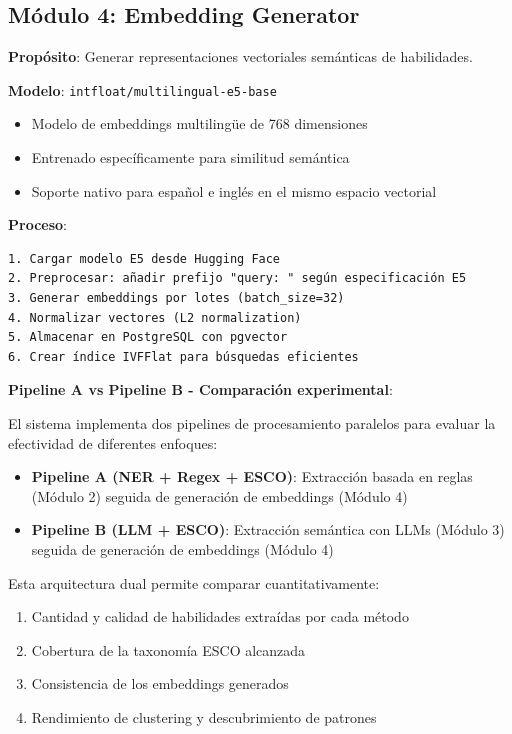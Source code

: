 \subsection{Módulo 4: Embedding Generator}

\textbf{Propósito}: Generar representaciones vectoriales semánticas de habilidades.

\textbf{Modelo}: \texttt{intfloat/multilingual-e5-base}
\begin{itemize}
    \item Modelo de embeddings multilingüe de 768 dimensiones
    \item Entrenado específicamente para similitud semántica
    \item Soporte nativo para español e inglés en el mismo espacio vectorial
\end{itemize}

\textbf{Proceso}:
\begin{verbatim}
1. Cargar modelo E5 desde Hugging Face
2. Preprocesar: añadir prefijo "query: " según especificación E5
3. Generar embeddings por lotes (batch_size=32)
4. Normalizar vectores (L2 normalization)
5. Almacenar en PostgreSQL con pgvector
6. Crear índice IVFFlat para búsquedas eficientes
\end{verbatim}

\textbf{Pipeline A vs Pipeline B - Comparación experimental}:

El sistema implementa dos pipelines de procesamiento paralelos para evaluar la efectividad de diferentes enfoques:

\begin{itemize}
    \item \textbf{Pipeline A (NER + Regex + ESCO)}: Extracción basada en reglas (Módulo 2) seguida de generación de embeddings (Módulo 4)
    \item \textbf{Pipeline B (LLM + ESCO)}: Extracción semántica con LLMs (Módulo 3) seguida de generación de embeddings (Módulo 4)
\end{itemize}

Esta arquitectura dual permite comparar cuantitativamente:
\begin{enumerate}
    \item Cantidad y calidad de habilidades extraídas por cada método
    \item Cobertura de la taxonomía ESCO alcanzada
    \item Consistencia de los embeddings generados
    \item Rendimiento de clustering y descubrimiento de patrones
\end{enumerate}

